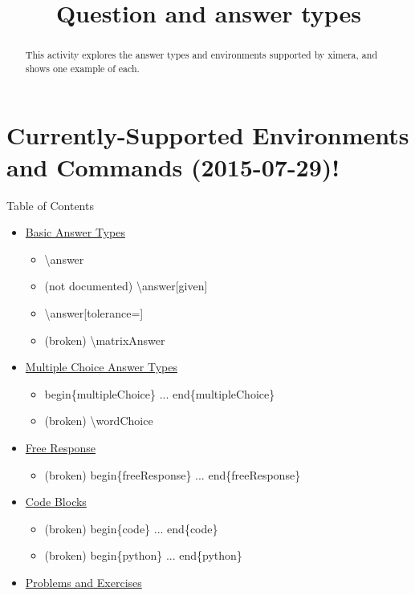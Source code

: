 \documentclass{ximera}
\title{Question and answer types}
\begin{document}
\begin{abstract}
  This activity explores the answer types and environments supported by ximera, and shows one example of each.
\end{abstract}

\maketitle

\section{Currently-Supported Environments and Commands (2015-07-29)!}

\begin{remark} Table of Contents

\begin{itemize}
\item \hyperref[BasicAnswerType]{Basic Answer Types}
  \begin{itemize}
    \item \textbackslash answer
    \item (not documented) \textbackslash answer[given]
    \item \textbackslash answer[tolerance=]
    \item (broken) \textbackslash matrixAnswer  
  \end{itemize}
\item \hyperref[MCAnswerType]{Multiple Choice Answer Types}
  \begin{itemize}
    \item begin\{multipleChoice\} ... end\{multipleChoice\}
    \item (broken) \textbackslash wordChoice
  \end{itemize}    
\item \hyperref[FRAnswerType]{Free Response}
  \begin{itemize}   
    \item (broken) begin\{freeResponse\} ... end\{freeResponse\}
  \end{itemize}
\item \hyperref[CodeAnswers]{Code Blocks}
  \begin{itemize}
    \item (broken) begin\{code\} ... end\{code\}
    \item (broken) begin\{python\} ... end\{python\}
  \end{itemize}
\item \hyperref[ProblemContainers]{Problems and Exercises}

\end{itemize}
\end{remark}
\end{document}
